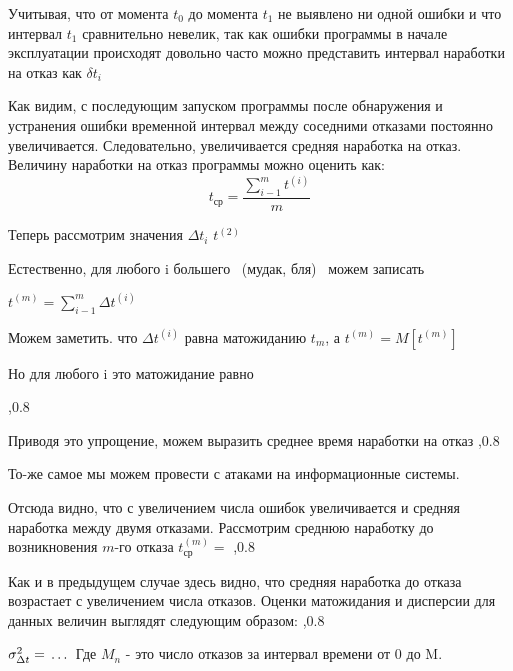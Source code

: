 \documentclass[a4paper, 12pt]{extarticle}
\begin{document}
	Учитывая, что от момента $t_0$ до момента $t_1$ не выявлено ни одной ошибки и что интервал $t_1$ сравнительно невелик, так как ошибки программы в начале эксплуатации происходят довольно часто можно представить интервал наработки на отказ как $\delta t_i$

	Как видим, с последующим запуском программы после обнаружения и устранения ошибки временной интервал между соседними отказами постоянно увеличивается. Следовательно, увеличивается средняя наработка на отказ. Величину наработки на отказ программы можно оценить как:
	$$t_{\mbox{ср}} = \frac{\sum\limits_{i-1}^m t^{(i)}}{m}$$
	
	Теперь рассмотрим значения $\Delta t_i$ 
	$t^{(2)}$
	
	Естественно, для любого i большего ~(мудак, бля)~ можем записать
	
	$t^{(m)} = \sum\limits_{i-1}^m \Delta t^{(i)}$
	
	Можем заметить. что $\Delta t^{(i)}$ равна матожиданию $t_m$, а
	$t^{(m)}=M[t^{(m)}]$ 
	
	Но для любого i это матожидание равно 
	
	,0.8
	
	Приводя это упрощение, можем выразить среднее время наработки на отказ
	,0.8
		
	То-же самое мы можем провести с атаками на информационные системы.
	
	Отсюда видно, что с увеличением числа ошибок увеличивается и средняя наработка между двумя отказами. Рассмотрим среднюю наработку до возникновения $m$-го отказа
	$t^{(m)}_{\mbox{ср}} = $
	,0.8
		
	Как и в предыдущем случае здесь видно, что средняя наработка до отказа возрастает с увеличением числа отказов.  Оценки матожидания и дисперсии для данных величин выглядят следующим образом: 
	,0.8
	
	$\- \sigma^2_{\Delta t} = \,\ldots\,$
	 Где $M_n$ - это число отказов за интервал времени от 0 до M.
	
	
\end{document}
